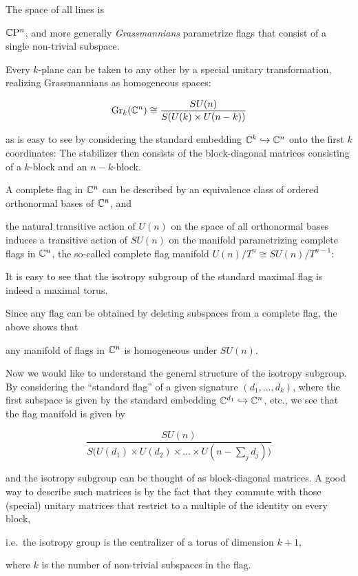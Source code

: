 \documentclass[parskip=half]{scrartcl}
\begin{document}
\begin{ex}[Flags in $\C^n$]\leavevmode
	\begin{numberedlist}
		\item The space of all lines is 
		\begin{onboard}
			$\mathbb{C}\mathrm{P}^n$, and more generally \emph{Grassmannians} parametrize flags that consist of a single non-trivial subspace.
		\end{onboard} 
		Every $k$-plane can be taken to any other by a special unitary transformation, realizing Grassmannians as homogeneous spaces:
		\begin{onboard}
		\begin{equation*}
			\operatorname{Gr}_k(\mathbb{C}^n)\cong \frac{SU(n)}{S(U(k)\times U(n-k))}
		\end{equation*}
		\end{onboard}
		as is easy to see by considering the standard embedding $\mathbb{C}^k\hookrightarrow\mathbb{C}^n$ onto the first $k$ coordinates: The stabilizer then consists of the block-diagonal matrices consisting of a $k$-block and an $n-k$-block.
		\item A complete flag in $\C^n$ can be described by an equivalence class of ordered orthonormal bases of $\C^n$, and 
		\begin{onboard}
			the natural transitive action of $U(n)$ on the space of all orthonormal bases induces a transitive action of $SU(n)$ on the manifold parametrizing complete flags in $\C^n$, the so-called complete flag manifold $U(n)/T^n\cong SU(n)/T^{n-1}$:
		\end{onboard}
		It is easy to see that the isotropy subgroup of the standard maximal flag is indeed a maximal torus.
		\item Since any flag can be obtained by deleting subspaces from a complete flag, the above shows that 
		\begin{onboard}
			any manifold of flags in $\C^n$ is homogeneous under $SU(n)$.
		\end{onboard}
		Now we would like to understand the general structure of the isotropy subgroup. By considering the ``standard flag'' of a given signature $(d_1,\dots, d_k)$, where the first subspace is given by the standard embedding $\mathbb{C}^{d_1}\hookrightarrow \mathbb{C}^n$, etc., we see that the flag manifold is given by
		\begin{onboard}
		\begin{equation*}
			\frac{SU(n)}{S\big(U(d_1)\times U(d_2) \times \dots \times U(n-\sum_j d_j)\big)}
		\end{equation*}
		\end{onboard}
		and the isotropy subgroup can be thought of as block-diagonal matrices. A good way to describe such matrices is by the fact that they commute with those (special) unitary matrices that restrict to a multiple of the identity on every block,
		\begin{onboard}
			i.e.~the isotropy group is the centralizer of a torus of dimension $k+1$,
		\end{onboard}
		where $k$ is the number of non-trivial subspaces in the flag.
	\end{numberedlist}
\end{ex}
\end{document}
